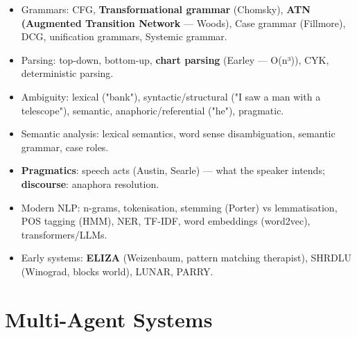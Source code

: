 

\begin{itemize}
\tightlist
\item
  Grammars: CFG, \textbf{Transformational grammar} (Chomsky), \textbf{ATN (Augmented Transition Network} --- Woods), Case grammar (Fillmore), DCG, unification grammars, Systemic grammar.
\item
  Parsing: top-down, bottom-up, \textbf{chart parsing} (Earley --- O(n³)), CYK, deterministic parsing.
\item
  Ambiguity: lexical ("bank"), syntactic/structural ("I saw a man with a telescope"), semantic, anaphoric/referential ("he"), pragmatic.
\item
  Semantic analysis: lexical semantics, word sense disambiguation, semantic grammar, case roles.
\item
  \textbf{Pragmatics}: speech acts (Austin, Searle) --- what the speaker intends; \textbf{discourse}: anaphora resolution.
\item
  Modern NLP: n-grams, tokenisation, stemming (Porter) vs lemmatisation, POS tagging (HMM), NER, TF-IDF, word embeddings (word2vec), transformers/LLMs.
\item
  Early systems: \textbf{ELIZA} (Weizenbaum, pattern matching therapist), SHRDLU (Winograd, blocks world), LUNAR, PARRY.
\end{itemize}

\needspace{130pt}

\hypertarget{p2-10--7-multi-agent-systems}{%
\section{Multi-Agent Systems}\label{p2-10--7-multi-agent-systems}}

\begingroup\small

